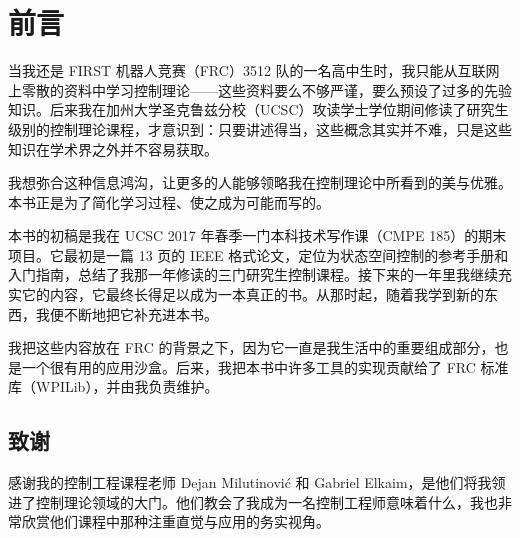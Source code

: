 ﻿
\chapter*{前言}

当我还是 FIRST 机器人竞赛（FRC）3512 队的一名高中生时，我只能从互联网上零散的资料中学习控制理论——这些资料要么不够严谨，要么预设了过多的先验知识。后来我在加州大学圣克鲁兹分校（UCSC）攻读学士学位期间修读了研究生级别的控制理论课程，才意识到：只要讲述得当，这些概念其实并不难，只是这些知识在学术界之外并不容易获取。

我想弥合这种信息鸿沟，让更多的人能够领略我在控制理论中所看到的美与优雅。本书正是为了简化学习过程、使之成为可能而写的。

本书的初稿是我在 UCSC 2017 年春季一门本科技术写作课（CMPE 185）的期末项目。它最初是一篇 13 页的 IEEE 格式论文，定位为状态空间控制的参考手册和入门指南，总结了我那一年修读的三门研究生控制课程。接下来的一年里我继续充实它的内容，它最终长得足以成为一本真正的书。从那时起，随着我学到新的东西，我便不断地把它补充进本书。

我把这些内容放在 FRC 的背景之下，因为它一直是我生活中的重要组成部分，也是一个很有用的应用沙盒。后来，我把本书中许多工具的实现贡献给了 FRC 标准库（WPILib），并由我负责维护。

\section*{致谢}

感谢我的控制工程课程老师 Dejan Milutinovi\'c 和 Gabriel Elkaim，是他们将我领进了控制理论领域的大门。他们教会了我成为一名控制工程师意味着什么，我也非常欣赏他们课程中那种注重直觉与应用的务实视角。
